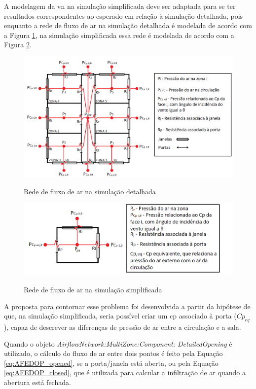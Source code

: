 A modelagem da \acrlong{vn} na simulação simplificada deve ser adaptada para se ter resultados correspondentes ao esperado em relação à simulação detalhada, pois enquanto a rede de fluxo de ar na simulação detalhada é modelada de acordo com a Figura \ref{fig:AFN_ref}, na simulação simplificada essa rede é modelada de acordo com a Figura \ref{fig:AFN_sz}.	

\vspace{20pt}
\begin{figure}[h]
	\centering
	\caption{Rede de fluxo de ar na simulação detalhada}
	\includegraphics[width=1\linewidth]{img/AFN_ref2.png}
	\label{fig:AFN_ref}
\end{figure}	

\begin{figure}[h]
	\centering
	\caption{Rede de fluxo de ar na simulação simplificada}
	\includegraphics[width=.8\linewidth]{img/AFN_sz2.png}
	\label{fig:AFN_sz}
\end{figure}
\newpage
A proposta para contornar esse problema foi desenvolvida a partir da hipótese de que, na simulação simplificada, seria possível criar um \acrshort{cp} associado à porta ($Cp_{eq}$), capaz de descrever as diferenças de pressão de ar entre a circulação e a sala.  %

Quando o objeto \textit{AirflowNetwork:MultiZone:Component: DetailedOpening} é utilizado, o cálculo do fluxo de ar entre dois pontos é feito pela Equação \ref{eq:AFEDOP_opened}, se a porta/janela está aberta, ou pela Equação \ref{eq:AFEDOP_closed}, que é utilizada para calcular a infiltração de ar quando a abertura está fechada.

